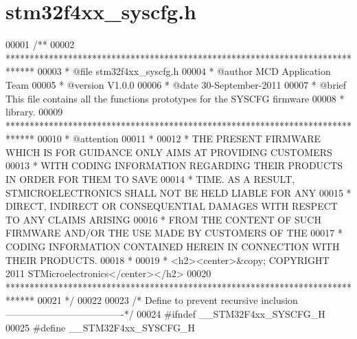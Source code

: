 \section{stm32f4xx\+\_\+syscfg.\+h}
\label{stm32f4xx__syscfg_8h_source}

\begin{DoxyCode}
00001 \textcolor{comment}{/**}
00002 \textcolor{comment}{  ******************************************************************************}
00003 \textcolor{comment}{  * @file    stm32f4xx\_syscfg.h}
00004 \textcolor{comment}{  * @author  MCD Application Team}
00005 \textcolor{comment}{  * @version V1.0.0}
00006 \textcolor{comment}{  * @date    30-September-2011}
00007 \textcolor{comment}{  * @brief   This file contains all the functions prototypes for the SYSCFG firmware}
00008 \textcolor{comment}{  *          library.}
00009 \textcolor{comment}{  ******************************************************************************}
00010 \textcolor{comment}{  * @attention}
00011 \textcolor{comment}{  *}
00012 \textcolor{comment}{  * THE PRESENT FIRMWARE WHICH IS FOR GUIDANCE ONLY AIMS AT PROVIDING CUSTOMERS}
00013 \textcolor{comment}{  * WITH CODING INFORMATION REGARDING THEIR PRODUCTS IN ORDER FOR THEM TO SAVE}
00014 \textcolor{comment}{  * TIME. AS A RESULT, STMICROELECTRONICS SHALL NOT BE HELD LIABLE FOR ANY}
00015 \textcolor{comment}{  * DIRECT, INDIRECT OR CONSEQUENTIAL DAMAGES WITH RESPECT TO ANY CLAIMS ARISING}
00016 \textcolor{comment}{  * FROM THE CONTENT OF SUCH FIRMWARE AND/OR THE USE MADE BY CUSTOMERS OF THE}
00017 \textcolor{comment}{  * CODING INFORMATION CONTAINED HEREIN IN CONNECTION WITH THEIR PRODUCTS.}
00018 \textcolor{comment}{  *}
00019 \textcolor{comment}{  * <h2><center>&copy; COPYRIGHT 2011 STMicroelectronics</center></h2>}
00020 \textcolor{comment}{  ******************************************************************************}
00021 \textcolor{comment}{  */}
00022 
00023 \textcolor{comment}{/* Define to prevent recursive inclusion -------------------------------------*/}
00024 \textcolor{preprocessor}{#}\textcolor{preprocessor}{ifndef} \textcolor{preprocessor}{\_\_STM32F4xx\_SYSCFG\_H}
00025 \textcolor{preprocessor}{#}\textcolor{preprocessor}{define} \textcolor{preprocessor}{\_\_STM32F4xx\_SYSCFG\_H}

\end{DoxyCode}
